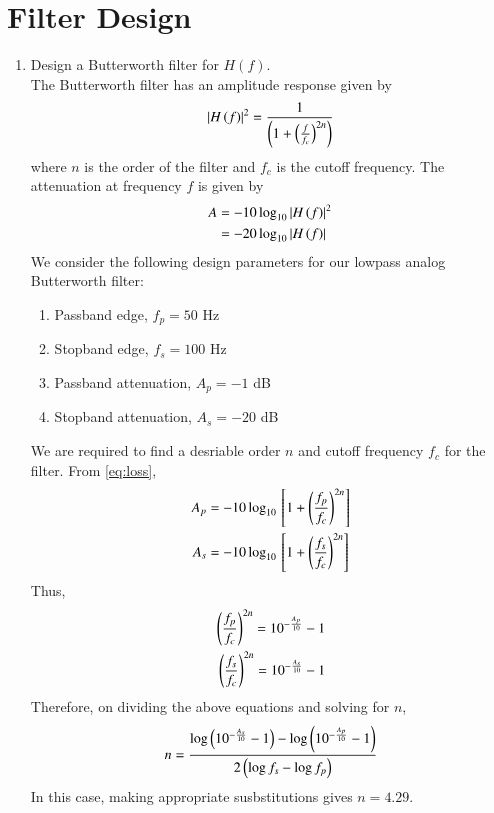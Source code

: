 \documentclass[journal,12pt,twocolumn]{IEEEtran}
\renewcommand\thesection{\arabic{section}}
\begin{document}
\section{Filter Design}
\begin{enumerate}[label=\thesection.\arabic*
,ref=\thesection.\theenumi]
\item Design a Butterworth filter for $H(f)$.\\
	\solution The Butterworth filter has an amplitude response
	given by
	\begin{align}
		\left\vert H\left(f\right)\right\vert^2 = \frac{1}{\left(1 + \left(\frac{f}{f_c}\right)^{2n}\right)}
	\end{align}
	where $n$ is the order of the filter and $f_c$ is the cutoff
	frequency. The attenuation at frequency $f$ is given by 
	\begin{align}
		A &= -10\log_{10}\left\vert H\left(f\right)\right\vert^2 \\
		&= -20\log_{10}\left\vert H\left(f\right)\right\vert
		\label{eq:loss}
	\end{align}
	We consider the following design parameters for our
	lowpass analog Butterworth filter:
	\begin{enumerate}
		\item Passband edge, $f_p = 50$ Hz
		\item Stopband edge, $f_s = 100$ Hz
		\item Passband attenuation, $A_p = -1$ dB
		\item Stopband attenuation, $A_s = -20$ dB
	\end{enumerate}
	We are required to find a desriable order $n$ and cutoff
	frequency $f_c$ for the filter. From \eqref{eq:loss},
	\begin{align}
		A_p &= -10\log_{10}{}\left[1 + \left(\frac{f_p}{f_c}\right)^{2n}\right] \\
		A_s &= -10\log_{10}{}\left[1 + \left(\frac{f_s}{f_c}\right)^{2n}\right]
	\end{align}
	Thus,
	\begin{align}
		\left(\frac{f_p}{f_c}\right)^{2n} = 10^{-\frac{A_p}{10}} - 1 \label{eq:fc1} \\
		\left(\frac{f_s}{f_c}\right)^{2n} = 10^{-\frac{A_s}{10}} - 1 \label{eq:fc2}
	\end{align}
	Therefore, on dividing the above equations and solving for $n$,
	\begin{align}
		n = \frac{\log\left(10^{-\frac{A_s}{10}} - 1\right) - 
			\log\left(10^{-\frac{A_p}{10}} - 1\right)}{2\left(\log{f_s} - \log{f_p}\right)}
	\end{align}
	In this case, making appropriate susbstitutions gives $n = 4.29$.

\end{enumerate}
\end{document}
